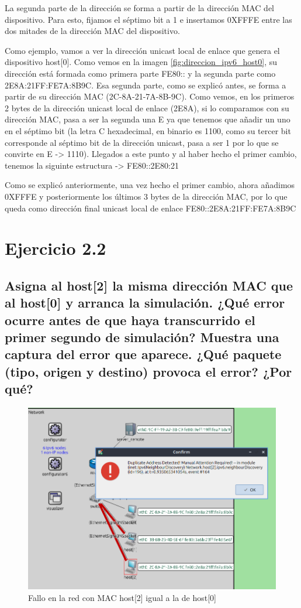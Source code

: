 La segunda parte de la dirección se forma a partir de la dirección MAC del dispositivo. Para esto, fijamos el séptimo bit a 1 e insertamos 0XFFFE entre las dos mitades de la dirección MAC del dispositivo. 

Como ejemplo, vamos a ver la dirección unicast local de enlace que genera el dispositivo host[0]. Como vemos en la imagen \ref{fig:direccion_ipv6_host0}, su dirección está formada como primera parte FE80:: y la segunda parte como 2E8A:21FF:FE7A:8B9C. Esa segunda parte, como se explicó antes, se forma a partir de su dirección MAC (2C-8A-21-7A-8B-9C). Como vemos, en los primeros 2 bytes de la dirección unicast local de enlace (2E8A), si lo comparamos con su dirección MAC, pasa a ser la segunda una E ya que tenemos que añadir un uno en el séptimo bit (la letra C hexadecimal, en binario es 1100, como su tercer bit corresponde al séptimo bit de la dirección unicast, pasa a ser 1 por lo que se convirte en E -> 1110). Llegados a este punto y al haber hecho el primer cambio, tenemos la siguinte estructura -> FE80::2E80:21

Como se explicó anteriormente, una vez hecho el primer cambio, ahora añadimos 0XFFFE  y posteriormente los últimos 3 bytes de la dirección MAC, por lo que queda como dirección final unicast local de enlace FE80::2E8A:21FF:FE7A:8B9C


\section{Ejercicio 2.2}\label{chap:ejer22}
\subsection{Asigna al host[2] la misma dirección MAC que al host[0] y arranca la simulación. ¿Qué error ocurre antes de
que haya transcurrido el primer segundo de simulación? Muestra una captura del error que aparece. ¿Qué
paquete (tipo, origen y destino) provoca el error? ¿Por qué?}

\begin{figure}[!ht]
    \centering
    \includegraphics[width=135mm, scale=0.75]{imaxes/captura_ejer2_2.png}
    \caption{Fallo en la red con MAC host[2] igual a la de host[0]}
    \label{fig:fallo_ipv6_host2}
\end{figure}

